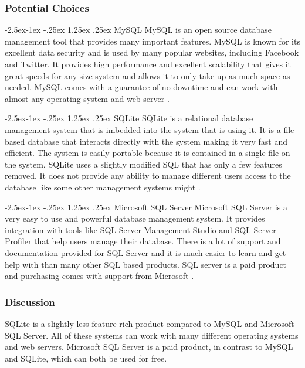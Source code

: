 \documentclass[onecolumn, draftclsnofoot,10pt, compsoc]{IEEEtran}
\makeatletter
\renewcommand\paragraph{\@startsection{paragraph}{4}{\z@}%
            {-2.5ex\@plus -1ex \@minus -.25ex}%
            {1.25ex \@plus .25ex}%
            {\normalfont\normalsize\bfseries}}
\makeatother
\begin{document}
\subsubsection{Potential Choices}

\paragraph{MySQL}
MySQL is an open source database management tool that provides many important features. MySQL is known for its excellent data security and is used by many popular websites, including Facebook and Twitter. It provides high performance and excellent scalability that gives it great speeds for any size system and allows it to only take up as much space as needed. MySQL comes with a guarantee of no downtime and can work with almost any operating system and web server \cite{mysql}.

\paragraph{SQLite}
SQLite is a relational database management system that is imbedded into the system that is using it. It is a file-based database that interacts directly with the system making it very fast and efficient. The system is easily portable because it is contained in a single file on the system. SQLite uses a slightly modified SQL that has only a few features removed. It does not provide any ability to manage different users access to the database like some other management systems might \cite{sqlite}.

\paragraph{Microsoft SQL Server}
Microsoft SQL Server is a very easy to use and powerful database management system. It provides integration with tools like SQL Server Management Studio and SQL Server Profiler that help users manage their database. There is a lot of support and documentation provided for SQL Server and it is much easier to learn and get help with than many other SQL based products. SQL server is a paid product and purchasing comes with support from Microsoft \cite{sqlserver}.

\subsubsection{Discussion}
SQLite is a slightly less feature rich product compared to MySQL and Microsoft SQL Server. All of these systems can work with many different operating systems and web servers. Microsoft SQL Server is a paid product, in contrast to MySQL and SQLite, which can both be used for free.
\end{document}
